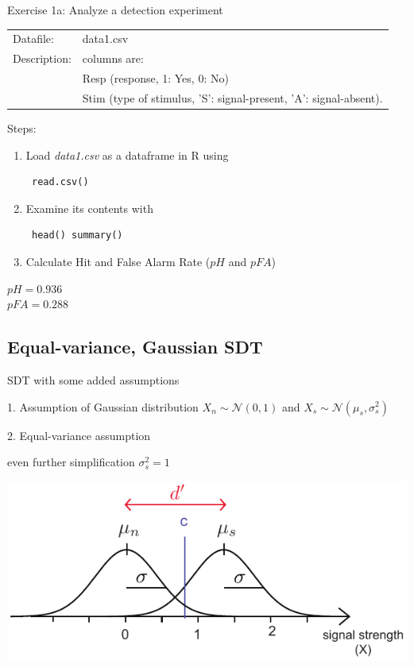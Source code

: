 \documentclass[10pt]{beamer}
\begin{document}
\begin{frame}[fragile]{Exercise 1a: Analyze a detection experiment}

\begin{tabular}{ll}
Datafile: & data1.csv\\
Description: & columns are: \\
& Resp (response, 1: Yes, 0: No)\\
& Stim (type of stimulus, 'S': signal-present, 'A': signal-absent).
\end{tabular}

\vspace{10pt}

Steps:
\begin{enumerate}
\item Load \textit{data1.csv} as a dataframe in R using \begin{verbatim} read.csv()\end{verbatim}
\item Examine its contents with \begin{verbatim} head() summary() \end{verbatim}
\item Calculate Hit and False Alarm Rate ($pH$ and $pFA$)
\end{enumerate}

\pause
\begin{center}
$pH = 0.936$\\
$pFA = 0.288 $
\end{center}
\end{frame}



\subsection{Equal-variance, Gaussian SDT}
\begin{frame}{SDT with some added assumptions}

\begin{block}{1. Assumption of Gaussian distribution }
$X_n \sim \mathcal{N} (0, 1)$ and 
$X_s \sim \mathcal{N}(\mu_s, \sigma^2_s)$
\end{block}

\begin{block}{2. Equal-variance assumption}

even further simplification $\sigma^2_s =  1$
\end{block}

\begin{center}
\includegraphics[scale=1]{figs/evgsdt.pdf}
\end{center}
\end{frame}
\end{document}
